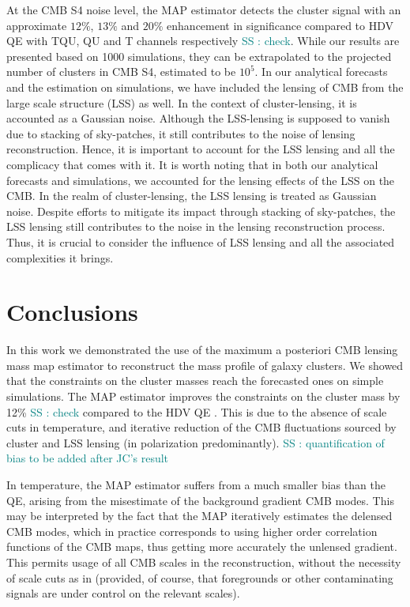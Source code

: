 \documentclass[prd, superscriptaddress, tightenlines, longbibliography, nofootinbib, eqsecnum, amsfonts, amsmath, floatfix, twocolumn, notitlepage]{revtex4-2}
\newcommand{\LL}[1]{{\color{orange}{LL: #1}}}
\newcommand{\bb}[1]{\textcolor{teal}{SS : #1}}
\begin{document}
At the CMB S4 noise level, the MAP estimator detects the cluster signal with an approximate $12\%$, $13\%$ and $20\%$ enhancement in significance compared to HDV QE with TQU, QU and T channels respectively \bb{check}.
While our results are presented based on 1000 simulations, they can be extrapolated to the projected number of clusters in CMB S4, estimated to be $10^5$. \LL{Maybe here give constraints on the mass with 100000 clusters?}
In our analytical forecasts and the estimation on simulations, we have included the lensing of CMB from the large scale structure (LSS) as well. 
In the context of cluster-lensing, it is accounted as a Gaussian noise. 
Although the LSS-lensing is supposed to vanish due to stacking of sky-patches, it still contributes to the noise of lensing reconstruction. 
Hence, it is important to account for the LSS lensing and all the complicacy that comes with it. 
It is worth noting that in both our analytical forecasts and simulations, we accounted for the lensing effects of the LSS on the CMB.
In the realm of cluster-lensing, the LSS lensing is treated as Gaussian noise. 
Despite efforts to mitigate its impact through stacking of sky-patches, the LSS lensing still contributes to the noise in the lensing reconstruction process. 
Thus, it is crucial to consider the influence of LSS lensing and all the associated complexities it brings.

\section{Conclusions}
\label{sec:conclusion}

In this work we demonstrated the use of the maximum a posteriori CMB lensing mass map estimator to reconstruct the mass profile of galaxy clusters.
We showed that the constraints on the cluster masses reach the forecasted ones on simple simulations.
The MAP estimator improves the constraints on the cluster mass by 12\% \bb{check} compared to the HDV QE \cite{Hu:2007bt} \LL{with joint temperature and polarization}. This is due to the absence of scale cuts in temperature, and iterative reduction of the CMB fluctuations sourced by cluster and LSS lensing (in polarization predominantly). \bb{quantification of bias to be added after JC's result}

In temperature, the MAP estimator suffers from a much smaller bias than the QE, arising from the misestimate of the background gradient CMB modes. This may be interpreted by the fact that the MAP iteratively estimates the delensed CMB modes, which in practice corresponds to using higher order correlation functions of the CMB maps, thus getting more accurately the unlensed gradient.
This permits usage of all CMB scales in the reconstruction, without the necessity of scale cuts as in \cite{Hu:2007bt} (provided, of course, that foregrounds or other contaminating signals are under control on the relevant scales).
\end{document}
